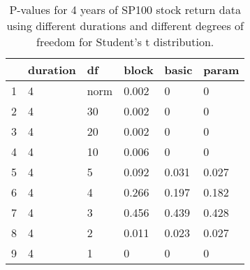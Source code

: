 \begin{table}[ht]
\centering
\caption{P-values for 4 years of SP100 stock return 
                   data using different durations
  and different degrees of freedom for Student's t distribution.} 
\label{table:SP1004}
\begin{tabular}{rlllll}
  \hline
 & duration & df & block & basic & param \\ 
  \hline
1 & 4 & norm & 0.002 & 0 & 0 \\ 
  2 & 4 & 30 & 0.002 & 0 & 0 \\ 
  3 & 4 & 20 & 0.002 & 0 & 0 \\ 
  4 & 4 & 10 & 0.006 & 0 & 0 \\ 
  5 & 4 & 5 & 0.092 & 0.031 & 0.027 \\ 
  6 & 4 & 4 & 0.266 & 0.197 & 0.182 \\ 
  7 & 4 & 3 & 0.456 & 0.439 & 0.428 \\ 
  8 & 4 & 2 & 0.011 & 0.023 & 0.027 \\ 
  9 & 4 & 1 & 0 & 0 & 0 \\ 
   \hline
\end{tabular}
\end{table}

